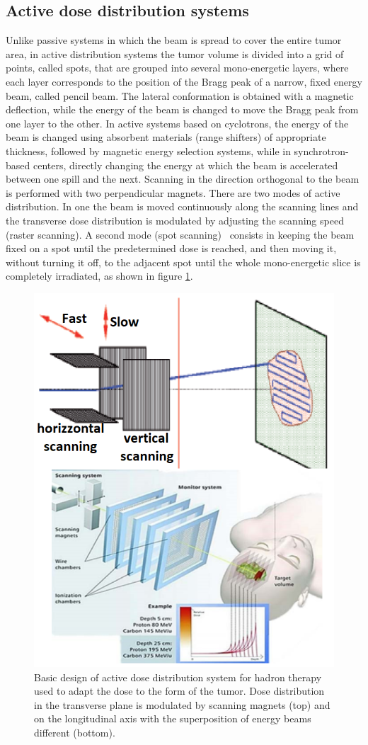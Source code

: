 \subsection{Active dose distribution systems}
\noindent Unlike passive systems in which the beam is spread to cover the entire tumor area, in active distribution systems the tumor volume is divided into a grid of points, called spots, that are grouped into several mono-energetic layers, where each layer corresponds to the position of the Bragg peak of a narrow, fixed energy beam, called pencil beam.
The lateral conformation is obtained with a magnetic deflection, while the energy of the beam is changed to move the Bragg peak from one layer to the other.
In active systems based on cyclotrons, the energy of the beam is changed using absorbent materials (range shifters) of appropriate thickness, followed by magnetic energy selection systems, while in synchrotron-based centers, directly changing the energy at which the beam is accelerated between one spill and the next.
Scanning in the direction orthogonal to the beam is performed with two perpendicular magnets.
\newline
There are two modes of active distribution. In one the beam is moved continuously along the scanning lines and the transverse dose distribution is modulated by adjusting the scanning speed (raster scanning). A second mode (spot scanning)~\cite{cnao} consists in keeping the beam fixed on a spot until the predetermined dose is reached, and then moving it, without turning it off, to the adjacent spot until the whole mono-energetic slice is completely irradiated, as shown in figure \ref{fig:active}.
\begin{figure}[H]
	\centering
	\includegraphics[width=0.7\linewidth]{IMG/ch1/Active2}
	\caption{Basic design of active dose distribution system for hadron therapy used to adapt the dose to the form of the tumor. Dose distribution in the transverse plane is modulated by scanning magnets (top) and on the longitudinal axis with the superposition of energy beams different (bottom).}
	\label{fig:active}
\end{figure}
